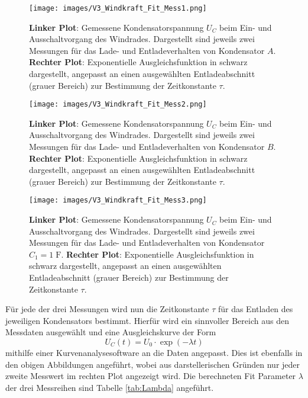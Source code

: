 \documentclass{article}
\begin{document}
\begin{figure}[H]
    \centering
    \texttt{[image: images/V3\_Windkraft\_Fit\_Mess1.png]}
    \caption{\textbf{Linker Plot}: Gemessene Kondensatorspannung $U_C$ beim Ein- und Ausschaltvorgang des Windrades. Dargestellt sind jeweils zwei Messungen für das Lade- und Entladeverhalten von Kondensator $A$. \textbf{Rechter Plot}: Exponentielle Ausgleichsfunktion in schwarz dargestellt, angepasst an einen ausgewählten Entladeabschnitt (grauer Bereich) zur Bestimmung der Zeitkonstante $\tau$. }
    \label{fig:V3_WK_Fit1}
\end{figure}

\begin{figure}[H]
    \centering
    \texttt{[image: images/V3\_Windkraft\_Fit\_Mess2.png]}
    \caption{\textbf{Linker Plot}: Gemessene Kondensatorspannung $U_C$ beim Ein- und Ausschaltvorgang des Windrades. Dargestellt sind jeweils zwei Messungen für das Lade- und Entladeverhalten von Kondensator $B$. \textbf{Rechter Plot}: Exponentielle Ausgleichsfunktion in schwarz dargestellt, angepasst an einen ausgewählten Entladeabschnitt (grauer Bereich) zur Bestimmung der Zeitkonstante $\tau$. }
    \label{fig:V3_WK_Fit2}
\end{figure}

\begin{figure}[H]
    \centering
    \texttt{[image: images/V3\_Windkraft\_Fit\_Mess3.png]}
    \caption{\textbf{Linker Plot}: Gemessene Kondensatorspannung $U_C$ beim Ein- und Ausschaltvorgang des Windrades. Dargestellt sind jeweils zwei Messungen für das Lade- und Entladeverhalten von Kondensator $C_1 = 1 \; \text{F}$. \textbf{Rechter Plot}: Exponentielle Ausgleichsfunktion in schwarz dargestellt, angepasst an einen ausgewählten Entladeabschnitt (grauer Bereich) zur Bestimmung der Zeitkonstante $\tau$.}
    \label{fig:V3_WK_Fit3}
\end{figure}

\noindent Für jede der drei Messungen wird nun die Zeitkonstante $\tau$ für das Entladen des jeweiligen Kondensators bestimmt. Hierfür wird ein sinnvoller Bereich aus den Messdaten ausgewählt und eine Ausgleichskurve der Form
$$U_C(t) = U_0 \cdot \exp(- \lambda t)$$
mithilfe einer Kurvenanalysesoftware \cite{Fit} an die Daten angepasst.
Dies ist ebenfalls in den obigen Abbildungen angeführt, wobei aus darstellerischen Gründen nur jeder zweite Messwert im rechten Plot angezeigt wird.
Die berechneten Fit Parameter $\lambda$ der drei Messreihen sind Tabelle \ref{tab:Lambda} angeführt.
\end{document}
